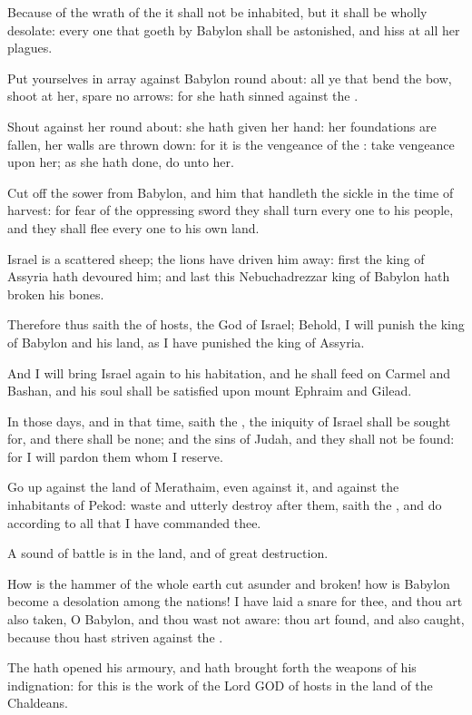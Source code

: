 \Verse Because of the wrath of the \LORD it shall not be inhabited, but it shall be wholly desolate: every one that goeth by Babylon shall be astonished, and hiss at all her plagues.

\Verse Put yourselves in array against Babylon round about: all ye that bend the bow, shoot at her, spare no arrows: for she hath sinned against the \LORD.

\Verse Shout against her round about: she hath given her hand: her foundations are fallen, her walls are thrown down: for it is the vengeance of the \LORD: take vengeance upon her; as she hath done, do unto her.

\Verse Cut off the sower from Babylon, and him that handleth the sickle in the time of harvest: for fear of the oppressing sword they shall turn every one to his people, and they shall flee every one to his own land.

\Verse Israel is a scattered sheep; the lions have driven him away: first the king of Assyria hath devoured him; and last this Nebuchadrezzar king of Babylon hath broken his bones.

\Verse Therefore thus saith the \LORD of hosts, the God of Israel; Behold, I will punish the king of Babylon and his land, as I have punished the king of Assyria.

\Verse And I will bring Israel again to his habitation, and he shall feed on Carmel and Bashan, and his soul shall be satisfied upon mount Ephraim and Gilead.

\Verse In those days, and in that time, saith the \LORD, the iniquity of Israel shall be sought for, and there shall be none; and the sins of Judah, and they shall not be found: for I will pardon them whom I reserve.

\Verse Go up against the land of Merathaim, even against it, and against the inhabitants of Pekod: waste and utterly destroy after them, saith the \LORD, and do according to all that I have commanded thee.

\Verse A sound of battle is in the land, and of great destruction.

\Verse How is the hammer of the whole earth cut asunder and broken! how is Babylon become a desolation among the nations!  \Verse I have laid a snare for thee, and thou art also taken, O Babylon, and thou wast not aware: thou art found, and also caught, because thou hast striven against the \LORD.

\Verse The \LORD hath opened his armoury, and hath brought forth the weapons of his indignation: for this is the work of the Lord GOD of hosts in the land of the Chaldeans.

